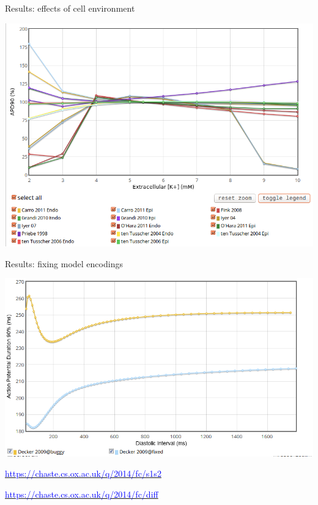 \documentclass[t,xcolor={usenames,dvipsnames}]{beamer}
\newcommand{\myhref}[2]{\href{#1}{\textcolor{Blue}{#2}}}
\newcommand{\myurl}[1]{\myhref{#1}{#1}}
\begin{document}
\begin{frame}{Results: effects of cell environment}
\begin{center}
\vspace{-.5cm}
\includegraphics[width=\textwidth]{weblab_extra_K}
\end{center}
\end{frame}


\begin{frame}{Results: fixing model encodings}
\begin{center}
\includegraphics[width=\textwidth]{decker_comparison}

\tiny
\myurl{https://chaste.cs.ox.ac.uk/q/2014/fc/s1s2}

\myurl{https://chaste.cs.ox.ac.uk/q/2014/fc/diff}
\end{center}
\end{frame}
\end{document}
